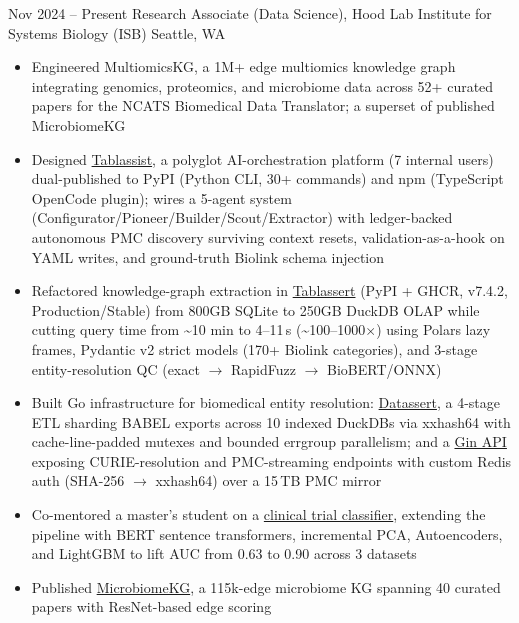 \documentclass[11pt]{moderncv}
\newcommand{\skyespace}{\vspace{8pt}}
\newcommand{\colorhref}[2]{\href{#1}{\textcolor{linkblue}{#2}}}
\begin{document}
\skyespace
\cventry
{Nov 2024 -- Present}
{Research Associate (Data Science), Hood Lab}
{Institute for Systems Biology (ISB)}
{Seattle, WA}
{}
{%
	\begin{itemize}
		\item Engineered MultiomicsKG, a 1M+ edge multiomics knowledge graph integrating genomics, proteomics, and microbiome data across 52+ curated papers for the NCATS Biomedical Data Translator; a superset of published MicrobiomeKG
		\item Designed \colorhref{https://github.com/SkyeAv/Tablassist}{Tablassist}, a polyglot AI-orchestration platform (7 internal users) dual-published to PyPI (Python CLI, 30+ commands) and npm (TypeScript OpenCode plugin); wires a 5-agent system (Configurator/Pioneer/Builder/Scout/Extractor) with ledger-backed autonomous PMC discovery surviving context resets, validation-as-a-hook on YAML writes, and ground-truth Biolink schema injection
		\item Refactored knowledge-graph extraction in \colorhref{https://skyeav.github.io/Tablassert/}{Tablassert} (PyPI + GHCR, v7.4.2, Production/Stable) from 800GB SQLite to 250GB DuckDB OLAP while cutting query time from \textasciitilde 10 min to 4--11\,s (\textasciitilde 100--1000$\times$) using Polars lazy frames, Pydantic v2 strict models (170+ Biolink categories), and 3-stage entity-resolution QC (exact $\rightarrow$ RapidFuzz $\rightarrow$ BioBERT/ONNX)
		\item Built Go infrastructure for biomedical entity resolution: \colorhref{https://github.com/SkyeAv/datassert}{Datassert}, a 4-stage ETL sharding BABEL exports across 10 indexed DuckDBs via xxhash64 with cache-line-padded mutexes and bounded errgroup parallelism; and a \colorhref{https://github.com/SkyeAv/configurator-api}{Gin API} exposing CURIE-resolution and PMC-streaming endpoints with custom Redis auth (SHA-256 $\rightarrow$ xxhash64) over a 15\,TB PMC mirror
		\item Co-mentored a master's student on a \colorhref{https://github.com/SkyeAv/CTClassifier}{clinical trial classifier}, extending the pipeline with BERT sentence transformers, incremental PCA, Autoencoders, and LightGBM to lift AUC from 0.63 to 0.90 across 3 datasets
		\item Published \colorhref{https://www.frontiersin.org/journals/systems-biology/articles/10.3389/fsysb.2025.1544432/full}{MicrobiomeKG}, a 115k-edge microbiome KG spanning 40 curated papers with ResNet-based edge scoring
	\end{itemize}
}
\end{document}
